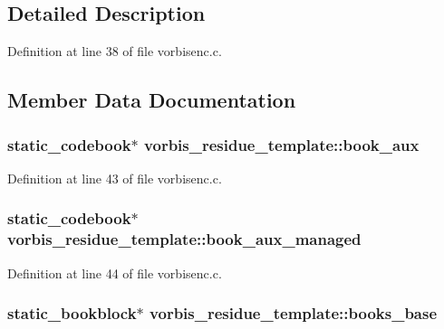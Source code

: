 \subsection{Detailed Description}


Definition at line 38 of file vorbisenc.\+c.



\subsection{Member Data Documentation}
\subsubsection[{\texorpdfstring{book\+\_\+aux}{book_aux}}]{ {\bf static\+\_\+codebook}$\ast$ vorbis\+\_\+residue\+\_\+template\+::book\+\_\+aux}\hypertarget{structvorbis__residue__template_a1758621ca074816c2a87102461e408fc}{}\label{structvorbis__residue__template_a1758621ca074816c2a87102461e408fc}


Definition at line 43 of file vorbisenc.\+c.

\subsubsection[{\texorpdfstring{book\+\_\+aux\+\_\+managed}{book_aux_managed}}]{ {\bf static\+\_\+codebook}$\ast$ vorbis\+\_\+residue\+\_\+template\+::book\+\_\+aux\+\_\+managed}\hypertarget{structvorbis__residue__template_ab4ea95da7d287d0dc6df64c957092837}{}\label{structvorbis__residue__template_ab4ea95da7d287d0dc6df64c957092837}


Definition at line 44 of file vorbisenc.\+c.

\subsubsection[{\texorpdfstring{books\+\_\+base}{books_base}}]{ {\bf static\+\_\+bookblock}$\ast$ vorbis\+\_\+residue\+\_\+template\+::books\+\_\+base}\hypertarget{structvorbis__residue__template_ad760c5513a8f21ed9ef3284d0d33c488}{}\label{structvorbis__residue__template_ad760c5513a8f21ed9ef3284d0d33c488}


